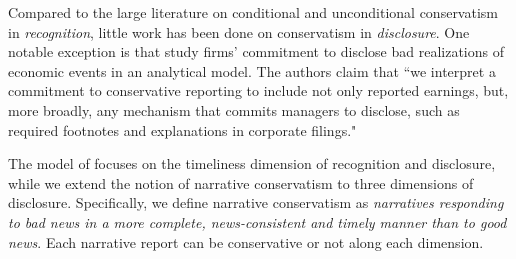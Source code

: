 \documentclass[letterpaper,12pt]{article}
\begin{document}
\begin{spacing}{1.5}
Compared to the large literature on conditional and unconditional conservatism in \textit{recognition}, little work has been done on conservatism in \textit{disclosure}. One notable exception is  that study firms' commitment to disclose bad realizations of economic events in an analytical model. The authors claim that ``we interpret a commitment to conservative reporting to include not only reported earnings, but, more broadly, any mechanism that commits managers to disclose, such as required footnotes and explanations in corporate filings." \cite[p. 73]{guayConservativeDisclosure2018}
\begin{comment}
	As \citeA[p. 243]{kothariManagersWithholdBad2009} state:
	\begin{adjustwidth}{1cm}{1cm}
	\begin{singlespace}
	\textit{Considerable research examines conservative} recognition \textit{in accounting in the United States and internationally (Basu [1997], Ball, Kothari, and Robin [2000], McNichols [1988]). However, there is little systematic evidence to suggest conservatism in firms’} disclosure \textit{practices, with the notable exception of disclosure of bad news to mitigate litigation risk.}
	\end{singlespace}
	\end{adjustwidth}
	In a recent analytical work, \citeA[pp. 73-74]{guayConservativeDisclosure2018} have expressed similar opinions:
	\begin{adjustwidth}{1cm}{1cm}
	\begin{singlespace}
	\textit{By way of an analogy, 20 years ago, much of the accounting literature on transparent financial disclosure emphasized constructs such as earnings timeliness, high-quality accruals, and asset/liability recognition. Today, scholars study a plethora of additional financial disclosure mechanisms, including management forecasts, conference calls, management discussion and analysis (MD\&A) disclosure, press releases, and social media outlets. A commitment to timely disclosure of bad news need not come exclusively through financial statement recognition, and we believe that a broader view of conservative disclosure will offer new paths forward for a literature that has struggled to develop theories to explain the efficiency of timely asymmetric earnings numbers. We encourage researchers to pursue these avenues to better understand how the very large literature on conservative financial reporting integrates with the equally large literature on corporate disclosure.}
	\end{singlespace}
	\end{adjustwidth}
\end{comment}
The model of  focuses on the timeliness dimension of recognition and disclosure, while we extend the notion of narrative conservatism to three dimensions of disclosure. Specifically, we define narrative conservatism as \textit{narratives responding to bad news in a more complete, news-consistent and timely manner than to good news}. Each narrative report can be conservative or not along each dimension.


\end{spacing}
\end{document}

